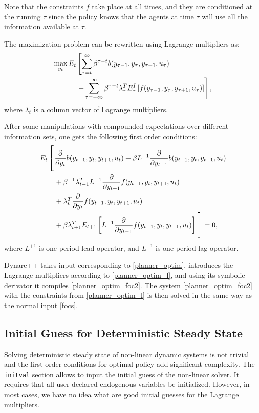 \documentclass[10pt]{article}
\begin{document}
Note that the constraints $f$ take place at all times, and they are
conditioned at the running $\tau$ since the policy knows that the
agents at time $\tau$ will use all the information available at
$\tau$.

The maximization problem can be rewritten using Lagrange multipliers as:
\begin{align}
\max_{y_t}E_t&\left[\sum_{\tau=t}^\infty\beta^{\tau-t}b(y_{\tau-1},y_\tau,y_{\tau+1},u_\tau)\right.\notag\\
&\left.+\sum_{\tau=-\infty}^{\infty}\beta^{\tau-t}\lambda^T_\tau E_\tau^I\left[f(y_{\tau-1},y_\tau,y_{\tau+1},u_\tau)\right]\right],
\label{planner_optim_l}
\end{align}
where $\lambda_t$ is a column vector of Lagrange multipliers.

After some manipulations with compounded expectations over different
information sets, one gets the following first order conditions:
\begin{align}
E_t\left[\vphantom{\frac{\int^(_)}{\int^(\_)}}\right.&\frac{\partial}{\partial y_t}b(y_{t-1},y_t,y_{t+1},u_t)+
\beta L^{+1}\frac{\partial}{\partial y_{t-1}}b(y_{t-1},y_t,y_{t+1},u_t)\notag\\
&+\beta^{-1}\lambda_{t-1}^TL^{-1}\frac{\partial}{\partial y_{t+1}}f(y_{t-1},y_t,y_{t+1},u_t)\notag\\
&+\lambda_t^T\frac{\partial}{\partial y_{t}}f(y_{t-1},y_t,y_{t+1},u_t)\notag\\
&+\beta\lambda_{t+1}^TE_{t+1}\left[L^{+1}\frac{\partial}{\partial y_{t-1}}f(y_{t-1},y_t,y_{t+1},u_t)\right]
\left.\vphantom{\frac{\int^(_)}{\int^(\_)}}\right]
 = 0,\label{planner_optim_foc2}
\end{align}
where $L^{+1}$ is one period lead operator, and $L^{-1}$ is one period lag operator.

Dynare++ takes input corresponding to \eqref{planner_optim},
introduces the Lagrange multipliers according to
\eqref{planner_optim_l}, and using its symbolic derivator it compiles
\eqref{planner_optim_foc2}. The system \eqref{planner_optim_foc2} with
the constraints from \eqref{planner_optim_l} is then solved in the
same way as the normal input \eqref{focs}.

\subsection{Initial Guess for Deterministic Steady State}
\label{opt_init}

Solving deterministic steady state of non-linear dynamic systems is
not trivial and the first order conditions for optimal policy add
significant complexity. The {\tt initval} section allows to input the
initial guess of the non-linear solver. It requires that all user
declared endogenous variables be initialized. However, in most cases,
we have no idea what are good initial guesses for the Lagrange
multipliers.
\end{document}

